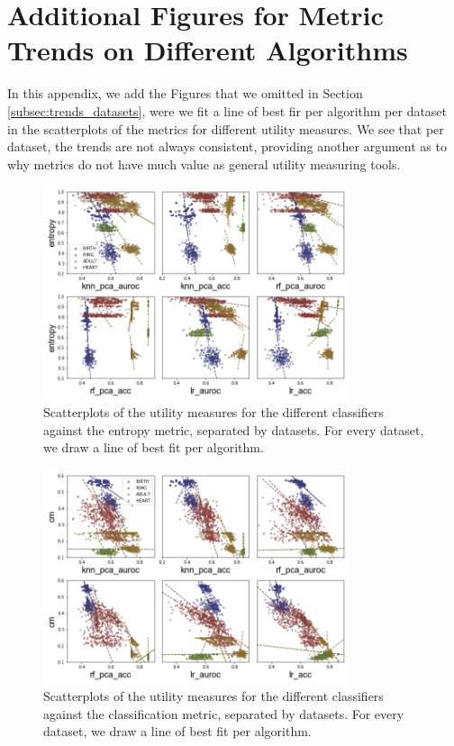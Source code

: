 \appendix
\chapter{Additional Figures for Metric Trends on Different Algorithms}
\label{app:sep_trends_per_algo}
In this appendix, we add the Figures that we omitted in Section \ref{subsec:trends_datasets}, were we fit a line of best fir per algorithm per dataset in the scatterplots of the metrics for different utility measures. We see that per dataset, the trends are not always consistent, providing another argument as to why metrics do not have much value as general utility measuring tools.

\begin{figure}[!ht]
    \centering
    \includegraphics[width=0.8\textwidth]{project/fig/scatter_sep_trends/entropy_scatter.png}
    \caption{Scatterplots of the utility measures for the different classifiers against the entropy metric, separated by datasets. For every dataset, we draw a line of best fit per algorithm.}
\end{figure}

\begin{figure}[!ht]
    \centering
    \includegraphics[width=0.8\textwidth]{project/fig/scatter_sep_trends/cm_scatter.png}
    \caption{Scatterplots of the utility measures for the different classifiers against the classification metric, separated by datasets. For every dataset, we draw a line of best fit per algorithm.}
\end{figure}

